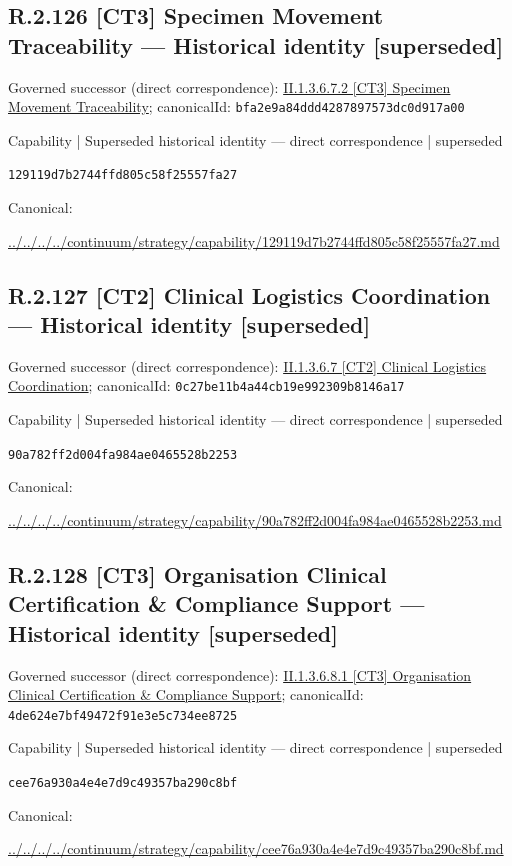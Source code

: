 \documentclass[10pt,a4paper]{article}
\begin{document}
\subsection*{R.2.126 [CT3] Specimen Movement Traceability — Historical identity [superseded]}
Governed successor (direct correspondence): \hyperref[element-bfa2e9a84ddd4287897573dc0d917a00]{II.1.3.6.7.2 [CT3] Specimen Movement Traceability}; canonicalId: \texttt{bfa2e9a84ddd4287897573dc0d917a00}\par
\label{element-129119d7b2744ffd805c58f25557fa27}
{\small Capability | Superseded historical identity — direct correspondence | superseded}\par
\texttt{129119d7b2744ffd805c58f25557fa27}\par
Canonical: \par
{\footnotesize\url{../../../../continuum/strategy/capability/129119d7b2744ffd805c58f25557fa27.md}}\par
\subsection*{R.2.127 [CT2] Clinical Logistics Coordination — Historical identity [superseded]}
Governed successor (direct correspondence): \hyperref[element-0c27be11b4a44cb19e992309b8146a17]{II.1.3.6.7 [CT2] Clinical Logistics Coordination}; canonicalId: \texttt{0c27be11b4a44cb19e992309b8146a17}\par
\label{element-90a782ff2d004fa984ae0465528b2253}
{\small Capability | Superseded historical identity — direct correspondence | superseded}\par
\texttt{90a782ff2d004fa984ae0465528b2253}\par
Canonical: \par
{\footnotesize\url{../../../../continuum/strategy/capability/90a782ff2d004fa984ae0465528b2253.md}}\par
\subsection*{R.2.128 [CT3] Organisation Clinical Certification \& Compliance Support — Historical identity [superseded]}
Governed successor (direct correspondence): \hyperref[element-4de624e7bf49472f91e3e5c734ee8725]{II.1.3.6.8.1 [CT3] Organisation Clinical Certification \& Compliance Support}; canonicalId: \texttt{4de624e7bf49472f91e3e5c734ee8725}\par
\label{element-cee76a930a4e4e7d9c49357ba290c8bf}
{\small Capability | Superseded historical identity — direct correspondence | superseded}\par
\texttt{cee76a930a4e4e7d9c49357ba290c8bf}\par
Canonical: \par
{\footnotesize\url{../../../../continuum/strategy/capability/cee76a930a4e4e7d9c49357ba290c8bf.md}}\par
\end{document}
